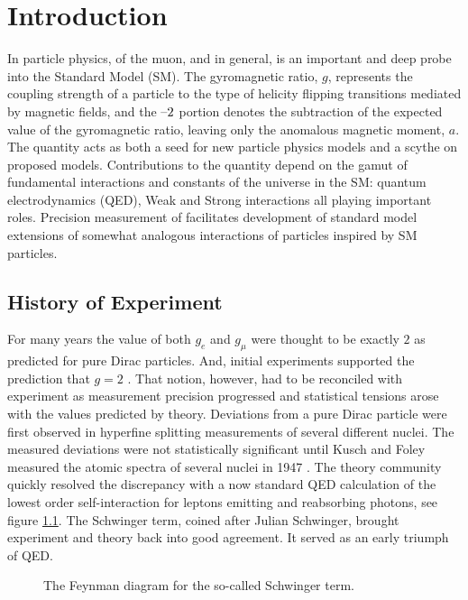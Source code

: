 \chapter {Introduction}
In particle physics, \gmtwo of the muon, and \gmtwo in general, is an important and deep probe into the Standard Model (SM). The gyromagnetic ratio, $g$, represents the coupling strength of a particle to the type of helicity flipping transitions mediated by magnetic fields, and the $\hbox{--}2$ portion denotes the subtraction of the expected value of the gyromagnetic ratio, leaving only the anomalous magnetic moment, $a$.  The quantity acts as both a seed for new particle physics models and a scythe on proposed models.   Contributions to the quantity depend on the gamut of fundamental interactions and constants of the universe in the SM: quantum electrodynamics (QED), Weak and Strong interactions all playing important roles.  Precision measurement of \gmtwo facilitates development of standard model extensions of somewhat analogous interactions of particles inspired by SM particles.

\section{History of Experiment}

For many years the value of both $g_e$ and $g_\mu$ were thought to be exactly $2$ as predicted for pure Dirac particles\cite{the-muon-g-2}. And, initial experiments supported the prediction that $g = 2$ . That notion, however, had to be reconciled with experiment as measurement precision progressed and statistical tensions arose with the values predicted by theory.  Deviations from a pure Dirac particle were first observed in hyperfine splitting measurements of several different nuclei.  The measured deviations were not statistically significant until Kusch and Foley measured the atomic spectra of several nuclei in 1947 \cite{kusch-foley}.  The theory community quickly resolved the discrepancy with a now standard QED calculation of the lowest order self-interaction for leptons emitting and reabsorbing photons, see figure \ref{fig:schwinger-diagram}.  The Schwinger term, coined after Julian Schwinger, brought experiment and theory back into good agreement.  It served as an early triumph of QED. 

\begin{figure}
\centering
{}
\label{fig:schwinger-diagram}
\caption{The Feynman diagram for the so-called Schwinger term.}
\end{figure}

